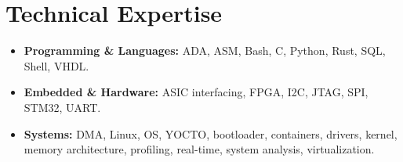 \documentclass[9pt,a4paper]{article}
\begin{document}
\section*{Technical Expertise}
\begin{tcolorbox}[mybox]
\begin{itemize}
\item \textbf{Programming \& Languages:} ADA, ASM, Bash, C, Python, Rust, SQL, Shell, VHDL.

\item \textbf{Embedded \& Hardware:} ASIC interfacing, FPGA, I2C, JTAG, SPI, STM32, UART.

\item \textbf{Systems:} DMA, Linux, OS, YOCTO, bootloader, containers, drivers, kernel, memory architecture, profiling, real-time, system analysis, virtualization.
\end{itemize}
\end{tcolorbox}
\end{document}
